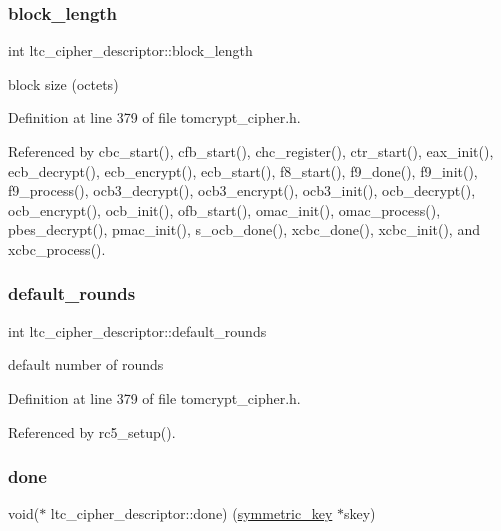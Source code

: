 \subsubsection{\texorpdfstring{block\_length}{block\_length}}
{\footnotesize\ttfamily int ltc\+\_\+cipher\+\_\+descriptor\+::block\+\_\+length}



block size (octets) 



Definition at line 379 of file tomcrypt\+\_\+cipher.\+h.



Referenced by cbc\+\_\+start(), cfb\+\_\+start(), chc\+\_\+register(), ctr\+\_\+start(), eax\+\_\+init(), ecb\+\_\+decrypt(), ecb\+\_\+encrypt(), ecb\+\_\+start(), f8\+\_\+start(), f9\+\_\+done(), f9\+\_\+init(), f9\+\_\+process(), ocb3\+\_\+decrypt(), ocb3\+\_\+encrypt(), ocb3\+\_\+init(), ocb\+\_\+decrypt(), ocb\+\_\+encrypt(), ocb\+\_\+init(), ofb\+\_\+start(), omac\+\_\+init(), omac\+\_\+process(), pbes\+\_\+decrypt(), pmac\+\_\+init(), s\+\_\+ocb\+\_\+done(), xcbc\+\_\+done(), xcbc\+\_\+init(), and xcbc\+\_\+process().

\mbox{\label{structltc__cipher__descriptor_a44ba0f7b336ec082eb9a04cf3e7ff804}} 
\subsubsection{\texorpdfstring{default\_rounds}{default\_rounds}}
{\footnotesize\ttfamily int ltc\+\_\+cipher\+\_\+descriptor\+::default\+\_\+rounds}



default number of rounds 



Definition at line 379 of file tomcrypt\+\_\+cipher.\+h.



Referenced by rc5\+\_\+setup().

\mbox{\label{structltc__cipher__descriptor_a0ad1c101005c70a69e40fded0e606191}} 
\subsubsection{\texorpdfstring{done}{done}}
{\footnotesize\ttfamily void($\ast$ ltc\+\_\+cipher\+\_\+descriptor\+::done) (\mbox{\hyperlink{tomcrypt__cipher_8h_ac5a146550efe94c415d95abc7e454362}{symmetric\+\_\+key}} $\ast$skey)}



